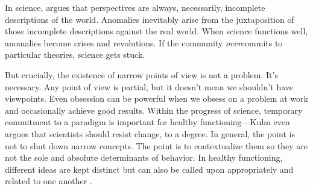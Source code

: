 \documentclass[11pt]{article}
\begin{document}
In science, \cite{kuhn1970structure} argues that perspectives are always, necessarily, incomplete descriptions of the world. Anomalies inevitably arise from the juxtaposition of those incomplete descriptions against the real world. When science functions well, anomalies become crises and revolutions. If the community \textit{over}commits to particular theories, science gets stuck.

But crucially, the existence of narrow points of view is not a problem. It's necessary. Any point of view is partial, but it doesn't mean we shouldn't have viewpoints. Even obsession can be powerful when we obsess on a problem at work and occasionally achieve good results. Within the progress of science, temporary commitment to a paradigm is important for healthy functioning---Kuhn even argues that scientists should resist change, to a degree. In general, the point is not to shut down narrow concepts. The point is to contextualize them so they are not the sole and absolute determinants of behavior. In healthy functioning, different ideas are kept distinct but can also be called upon appropriately and related to one another \citep{hatano1984two, herzog2014harnessing, gigerenzer2011heuristic, spiro1988cognitive, suedfeld1992conceptual}. 




\end{document}

